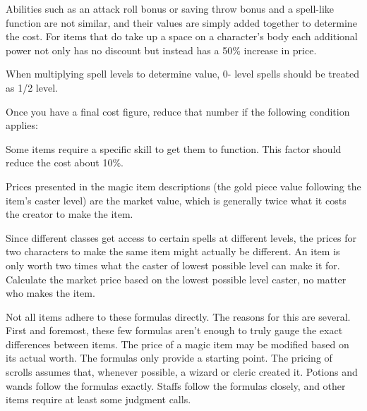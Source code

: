  Abilities such as an attack roll bonus or saving throw bonus and a spell-like function are not similar, and their values are simply added together to determine the cost. For items that do take up a space on a character's body each additional power not only has no discount but instead has a 50\% increase in price.

 When multiplying spell levels to determine value, 0- level spells should be treated as 1/2 level.

 Once you have a final cost figure, reduce that number if the following condition applies:
\begin{itemize*}
 Some items require a specific skill to get them to function. This factor should reduce the cost about 10\%.
\end{itemize*}

Prices presented in the magic item descriptions (the gold piece value following the item's caster level) are the market value, which is generally twice what it costs the creator to make the item.

Since different classes get access to certain spells at different levels, the prices for two characters to make the same item might actually be different. An item is only worth two times what the caster of lowest possible level can make it for. Calculate the market price based on the lowest possible level caster, no matter who makes the item.

Not all items adhere to these formulas directly. The reasons for this are several. First and foremost, these few formulas aren't enough to truly gauge the exact differences between items. The price of a magic item may be modified based on its actual worth. The formulas only provide a starting point. The pricing of scrolls assumes that, whenever possible, a wizard or cleric created it. Potions and wands follow the formulas exactly. Staffs follow the formulas closely, and other items require at least some judgment calls.

